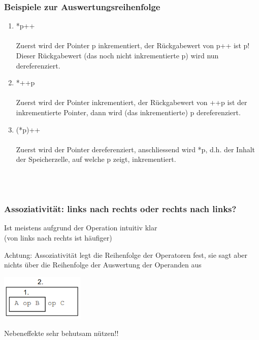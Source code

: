 			\hspace*{0.5cm}
			\begin{minipage}[t]{8 cm}
				\subsubsection{Beispiele zur Auswertungsreihenfolge}
					\begin{enumerate}
						\item *p++\\\\
						Zuerst wird der Pointer p inkrementiert, der Rückgabewert von p++ ist p! Dieser 
						Rückgabewert (das noch nicht inkrementierte p) wird nun dereferenziert.
						\item *++p\\\\
						Zuerst wird der Pointer inkrementiert, der Rückgabewert von ++p ist der inkrementierte Pointer, dann wird (das inkrementierte) p dereferenziert.
						\item (*p)++\\\\
						Zuerst wird der Pointer dereferenziert, anschliessend wird *p, d.h. der Inhalt der 
						Speicherzelle, auf welche p zeigt, inkrementiert.
					\end{enumerate}
			\end{minipage}\\\\
			\begin{minipage}[t]{9 cm}
				\subsubsection{Assoziativität: links nach rechts oder rechts nach links?}
					\begin{compactitem}
						\item Ist meistens aufgrund der Operation intuitiv klar\\ (von links nach rechts ist häufiger)
						\item Achtung: Assoziativität legt die
						Reihenfolge der Operatoren fest, sie sagt
						aber nichts über die Reihenfolge der Auswertung der Operanden aus
					\end{compactitem}
					\hspace*{0.7cm}
					\includegraphics[width=0.3\textwidth]{pics/assoziativitaet.png}
					\begin{compactitem}
						\item Nebeneffekte sehr behutsam nützen!! 
					\end{compactitem}
			\end{minipage}
